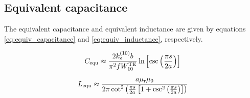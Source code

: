 \subsection{Equivalent capacitance}

The equivalent capacitance and equivalent inductance are given by equations \ref{eq:equiv_capacitance} and \ref{eq:equiv_inductance}, respectively.

\begin{equation}
C_{\rm equ} \approx \frac{2 k_{\rm z}^{\rm (10)} b}{\pi^2 f W_{\rm 10}^{\rm TE}} \ln \left[ \csc \left( \frac{\pi s}{2a} \right) \right]
\label{eq:equiv_capacitance}
\end{equation}

\begin{equation}
L_{\rm equ} \approx \frac{a \mu_{\rm r} \mu_{\rm 0}}{2 \pi \cot^2 \left( \frac{\pi s}{2a} \left[ 1 + \csc^2 \left( \frac{\pi s}{2a}\right) \right] \right)}
\label{eq:equiv_inductance}
\end{equation}